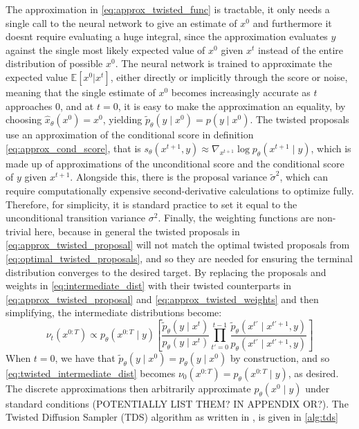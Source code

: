 The approximation in \eqref{eq:approx_twisted_func} is tractable, it only needs a single call to the neural network to give an estimate of $x^0$ and furthermore it doesnt require evaluating a huge integral, since the approximation evaluates $y$ against the single most likely expected value of $x^0$ given $x^t$ instead of the entire distribution of possible $x^0$. The neural network is trained to approximate the expected value $\mathbb{E}[x^0 | x^t]$, either directly or implicitly through the score or noise, meaning that the single estimate of $x^0$ becomes increasingly accurate as $t$ approaches $0$, and at $t = 0$, it is easy to make the approximation an equality, by choosing $\hat{x}_\theta(x^0) = x^0$, yielding $\tilde{p}_\theta(y \mid x^0) = p(y \mid x^0)$. The twisted proposals use an approximation of the conditional score in definition \eqref{eq:approx_cond_score}, that is $s_\theta(x^{t+1},y) \approx \nabla_{x^{t+1}} \log p_\theta(x^{t+1}\mid y)$, which is made up of approximations of the unconditional score and the conditional score of $y$ given $x^{t+1}$. Alongside this, there is the proposal variance $\tilde{\sigma}^2$, which can require computationally expensive second-derivative calculations to optimize fully. Therefore, for simplicity, it is standard practice to set it equal to the unconditional transition variance $\sigma^2$. Finally, the weighting functions are non-trivial here, because in general the twisted proposals in \eqref{eq:approx_twisted_proposal} will not match the optimal twisted proposals from \eqref{eq:optimal_twisted_proposals}, and so they are needed for ensuring the terminal distribution converges to the desired target. By replacing the proposals and weights in \eqref{eq:intermediate_dist} with their twisted counterparts in \eqref{eq:approx_twisted_proposal} and \eqref{eq:approx_twisted_weights} and then simplifying, the intermediate distributions become:
\begin{equation}
	\nu_t(x^{0:T}) \propto p_\theta(x^{0:T} \mid y) \left[ \frac{\tilde{p}_\theta(y \mid x^t)}{p_\theta(y \mid x^t)} \prod_{t'=0}^{t-1} \frac{\tilde{p}_\theta(x^{t'} \mid x^{t'+1}, y)}{p_\theta(x^{t'} \mid x^{t'+1}, y)} \right]
	\label{eq:twisted_intermediate_dist}
\end{equation}
When $t = 0$, we have that $\tilde{p}_\theta(y \mid x^0) = p_\theta(y \mid x^0)$ by construction, and so \eqref{eq:twisted_intermediate_dist} becomes $\nu_0(x^{0:T}) = p_\theta(x^{0:T} \mid y)$, as desired. The discrete approximations then arbitrarily approximate $p_\theta(x^0 \mid y)$ under standard conditions (POTENTIALLY LIST THEM? IN APPENDIX OR?). The Twisted Diffusion Sampler (TDS) algorithm as written in \cite{wu2024practicalasymptoticallyexactconditional}, is given in \eqref{alg:tds}\\
